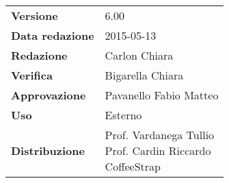 \documentclass[a4paper]{article}
\begin{document}
			\pagestyle{roman}
			
			\newpage
			

				\begin{center}
					\tabulinesep=6pt
					\begin{tabu} {X[r]|X[l]}
						\textbf{Versione} & 6.00 \\
						\textbf{Data redazione} & 2015-05-13 \\
						\textbf{Redazione} & \parbox[t]{0.4\textwidth}{Carlon Chiara} \\
						\textbf{Verifica} & \parbox[t]{0.4\textwidth}{Bigarella Chiara} \\
						\textbf{Approvazione} & \parbox[t]{0.4\textwidth}{Pavanello Fabio Matteo} \\
						\textbf{Uso} & Esterno \\
						\textbf{Distribuzione} & \parbox[t]{0.4\textwidth}{Prof. Vardanega Tullio \\ Prof. Cardin Riccardo \\ CoffeeStrap} \\
					\end{tabu}
				\end{center}

	
			\newpage
			
\end{document}

